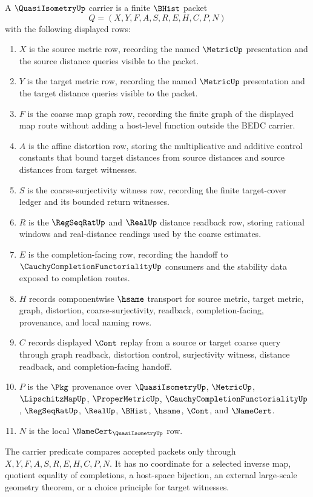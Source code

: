 \begin{definition}
\label{def:quasi-isometry-carrier}
A $\QuasiIsometryUp$ carrier is a finite $\BHist$ packet
$$
Q=(X,Y,F,A,S,R,E,H,C,P,N)
$$
with the following displayed rows:
\begin{enumerate}
\item $X$ is the source metric row, recording the named $\MetricUp$ presentation and the source distance queries visible to the packet.
\item $Y$ is the target metric row, recording the named $\MetricUp$ presentation and the target distance queries visible to the packet.
\item $F$ is the coarse map graph row, recording the finite graph of the displayed map route without adding a host-level function outside the BEDC carrier.
\item $A$ is the affine distortion row, storing the multiplicative and additive control constants that bound target distances from source distances and source distances from target witnesses.
\item $S$ is the coarse-surjectivity witness row, recording the finite target-cover ledger and its bounded return witnesses.
\item $R$ is the $\RegSeqRatUp$ and $\RealUp$ distance readback row, storing rational windows and real-distance readings used by the coarse estimates.
\item $E$ is the completion-facing row, recording the handoff to $\CauchyCompletionFunctorialityUp$ consumers and the stability data exposed to completion routes.
\item $H$ records componentwise $\hsame$ transport for source metric, target metric, graph, distortion, coarse-surjectivity, readback, completion-facing, provenance, and local naming rows.
\item $C$ records displayed $\Cont$ replay from a source or target coarse query through graph readback, distortion control, surjectivity witness, distance readback, and completion-facing handoff.
\item $P$ is the $\Pkg$ provenance over $\QuasiIsometryUp$, $\MetricUp$, $\LipschitzMapUp$, $\ProperMetricUp$, $\CauchyCompletionFunctorialityUp$, $\RegSeqRatUp$, $\RealUp$, $\BHist$, $\hsame$, $\Cont$, and $\NameCert$.
\item $N$ is the local $\NameCert_{\QuasiIsometryUp}$ row.
\end{enumerate}
The carrier predicate compares accepted packets only through $X,Y,F,A,S,R,E,H,C,P,N$. It has no coordinate for a selected inverse map, quotient equality of completions, a host-space bijection, an external large-scale geometry theorem, or a choice principle for target witnesses.
\end{definition}

